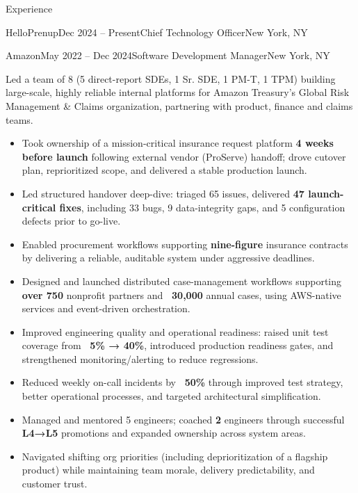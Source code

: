 \documentclass{resume} %
\begin{document}
\begin{rSection}{Experience}
\begin{rSubsection}{HelloPrenup}{Dec 2024 -- Present}{Chief Technology Officer}{New York, NY}
\end{rSubsection}


\begin{rSubsection}{Amazon}{May 2022 -- Dec 2024}{Software Development Manager}{New York, NY}

Led a team of 8 (5 direct-report SDEs, 1 Sr. SDE, 1 PM-T, 1 TPM) building large-scale, highly reliable internal platforms for Amazon Treasury's Global Risk Management \& Claims organization, partnering with product, finance and claims teams.

\begin{itemize}
  \item Took ownership of a mission-critical insurance request platform \textbf{4 weeks before launch} following external vendor (ProServe) handoff; drove cutover plan, reprioritized scope, and delivered a stable production launch.
  \item Led structured handover deep-dive: triaged 65 issues, delivered \textbf{47 launch-critical fixes}, including 33 bugs, 9 data-integrity gaps, and 5 configuration defects prior to go-live.
  \item Enabled procurement workflows supporting \textbf{nine-figure} insurance contracts by delivering a reliable, auditable system under aggressive deadlines.
  \item Designed and launched distributed case-management workflows supporting \textbf{over 750} nonprofit partners and \textbf{~30,000} annual cases, using AWS-native services and event-driven orchestration.
  \item Improved engineering quality and operational readiness: raised unit test coverage from \textbf{~5\% → 40\%}, introduced production readiness gates, and strengthened monitoring/alerting to reduce regressions.
  \item Reduced weekly on-call incidents by \textbf{~50\%} through improved test strategy, better operational processes, and targeted architectural simplification.
  \item Managed and mentored 5 engineers; coached \textbf{2} engineers through successful \textbf{L4→L5} promotions and expanded ownership across system areas.
  \item Navigated shifting org priorities (including deprioritization of a flagship product) while maintaining team morale, delivery predictability, and customer trust.
\end{itemize}


\end{rSubsection}
\end{rSection}
\end{document}
